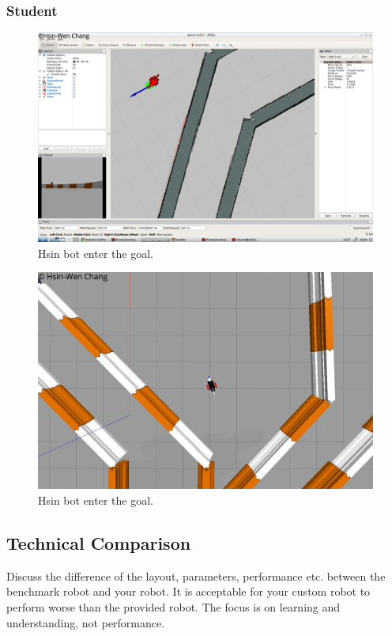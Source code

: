 \documentclass[10pt,journal,compsoc]{IEEEtran}
\begin{document}
\subsubsection{Student}
\begin{figure}[thpb]
      \centering
      \includegraphics[width=\linewidth]{rvizGoal.png}
      \caption{Hsin bot enter the goal.}
      \label{fig:robot1}
\end{figure}
\begin{figure}[thpb]
      \centering
      \includegraphics[width=\linewidth]{gazeboGoal.jpg}
      \caption{Hsin bot enter the goal.}
      \label{fig:robot1}
\end{figure}
\subsection{Technical Comparison} %
Discuss the difference of the layout, parameters, performance etc. between the benchmark robot and your robot. It is acceptable for your custom robot to perform worse than the provided robot. The focus is on learning and understanding, not performance. 
\end{document}
